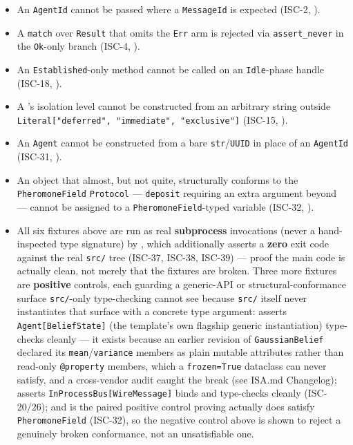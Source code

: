 \documentclass[
  english,
]{article}
\newcounter{none} %
\providecommand{\tightlist}{%
  \setlength{\itemsep}{0pt}\setlength{\parskip}{0pt}}
\theoremstyle{definition}
\begin{document}
\begin{itemize}
\tightlist
\item
  An \texttt{AgentId} cannot be passed where a \texttt{MessageId} is
  expected (ISC-2, ).
\item
  A \texttt{match} over \texttt{Result} that omits the \texttt{Err} arm
  is rejected via \texttt{assert\_never} in the \texttt{Ok}-only branch
  (ISC-4, ).
\item
  An \texttt{Established}-only method cannot be called on an
  \texttt{Idle}-phase handle (ISC-18,
  ).
\item
  A 's isolation level cannot be constructed
  from an arbitrary string outside
  \texttt{Literal{[}"deferred",\ "immediate",\ "exclusive"{]}} (ISC-15,
  ).
\item
  An \texttt{Agent} cannot be constructed from a bare
  \texttt{str}/\texttt{UUID} in place of an \texttt{AgentId} (ISC-31,
  ).
\item
  An object that almost, but not quite, structurally conforms to the
  \texttt{PheromoneField} \texttt{Protocol} --- \texttt{deposit}
  requiring an extra argument beyond  ---
  cannot be assigned to a \texttt{PheromoneField}-typed variable
  (ISC-32,
  ).
\item
  All six fixtures above are run as real 
  \textbf{subprocess} invocations (never a hand-inspected type
  signature) by , which additionally
  asserts a \textbf{zero} exit code against the real \texttt{src/} tree
  (ISC-37, ISC-38, ISC-39) --- proof the main code is actually clean,
  not merely that the fixtures are broken. Three more fixtures are
  \textbf{positive} controls, each guarding a generic-API or
  structural-conformance surface \texttt{src/}-only type-checking cannot
  see because \texttt{src/} itself never instantiates that surface with
  a concrete type argument:
   asserts
  \texttt{Agent{[}BeliefState{]}} (the template's own flagship generic
  instantiation) type-checks cleanly --- it exists because an earlier
  revision of \texttt{GaussianBelief} declared its
  \texttt{mean}/\texttt{variance} members as plain mutable attributes
  rather than read-only \texttt{@property} members, which a
  \texttt{frozen=True} dataclass can never satisfy, and a cross-vendor
  audit caught the break (see ISA.md Changelog);
   asserts
  \texttt{InProcessBus{[}WireMessage{]}} binds and type-checks cleanly
  (ISC-20/26); and  is the
  paired positive control proving 
  actually does satisfy \texttt{PheromoneField} (ISC-32), so the
  negative control above is shown to reject a genuinely broken
  conformance, not an unsatisfiable one.
\end{itemize}
\end{document}
